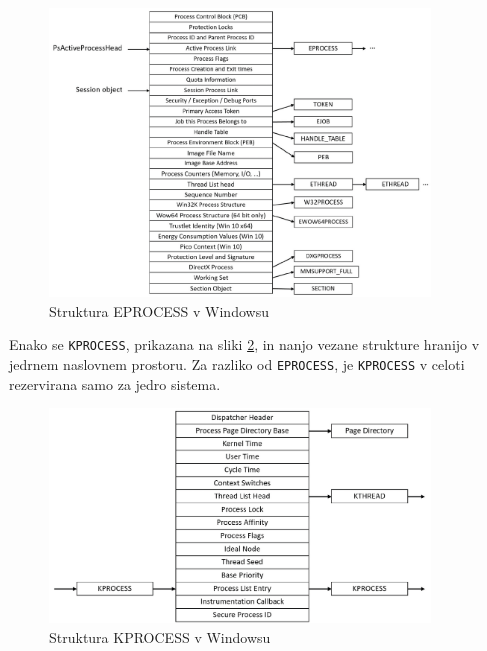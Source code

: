 \documentclass[a4paper,12pt,openright]{book}
\begin{document}
\begin{figure}[h!]
	\begin{center}
		\includegraphics[width=0.9\textwidth]{images/windows_eprocess.png}
	\end{center}
	\caption{Struktura EPROCESS v Windowsu \cite{Yosifovich_Russinovich_Solomon_Ionescu_2017}}
	\label{fig:windows_eprocess}
\end{figure}

Enako se \texttt{KPROCESS}, prikazana na sliki \ref{fig:windows_kprocess}, in nanjo vezane strukture hranijo v jedrnem naslovnem prostoru.
Za razliko od \texttt{EPROCESS}, je \texttt{KPROCESS} v celoti rezervirana samo za jedro sistema.

\begin{figure}[h!]
	\begin{center}
		\includegraphics[width=0.9\textwidth]{images/windows_kprocess.png}
	\end{center}
	\caption{Struktura KPROCESS v Windowsu \cite{Yosifovich_Russinovich_Solomon_Ionescu_2017}}
	\label{fig:windows_kprocess}
\end{figure}
\end{document}
